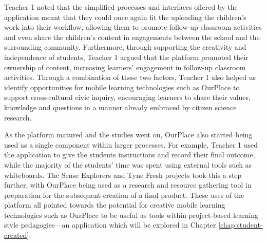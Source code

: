 Teacher 1 noted that the simplified processes and interfaces offered by the application meant that they could once again fit the uploading the children’s work into their workflow, allowing them to promote follow-up classroom activities and even share the children's content in engagements between the school and the surrounding community. Furthermore, through supporting the creativity and independence of students, Teacher 1 argued that the platform promoted their ownership of content, increasing learners’ engagement in follow-up classroom activities. Through a combination of these two factors, Teacher 1 also helped us identify opportunities for mobile learning technologies such as OurPlace to support cross-cultural civic inquiry, encouraging learners to share their values, knowledge and questions in a manner already embraced by citizen science research.

As the platform matured and the studies went on, OurPlace also started being used as a single component within larger processes. For example, Teacher 1 used the application to give the students instructions and record their final outcome, while the majority of the students’ time was spent using external tools such as whiteboards. The Sense Explorers and Tyne Fresh projects took this a step further, with OurPlace being used as a research and resource gathering tool in preparation for the subsequent creation of a final product. These uses of the platform all pointed towards the potential for creative mobile learning technologies such as OurPlace to be useful as tools within project-based learning style pedagogies---an application which will be explored in Chapter \ref{chap:student-created}.